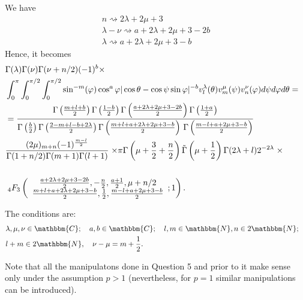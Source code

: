 \documentclass{article}
\begin{document}
\begin{answer}
  We have
  \begin{eqnarray}
    & n \rightsquigarrow 2 \lambda + 2 \mu + 3 &  \nonumber\\
    & \lambda - \nu \rightsquigarrow a + 2 \lambda + 2 \mu + 3 - 2 b & 
    \nonumber\\
    & \lambda \rightsquigarrow a + 2 \lambda + 2 \mu + 3 - b &  \nonumber
  \end{eqnarray}
  Hence, it becomes
  \begin{eqnarray}
    & \Gamma (\lambda) \Gamma (\nu) \Gamma (\nu + n / 2) (- 1)^b \times & 
    \nonumber\\
    & \int_0^{\pi} \int_0^{\pi / 2} \int_0^{\pi / 2} \sin^{- m} (\varphi)
    \cos^a \varphi | \cos \theta - \cos \psi \sin \varphi |^{- b}
    v^{\lambda}_l (\theta) v_m^{\mu} (\psi) v_n^{\nu} (\varphi) d \psi d
    \varphi d \theta = &  \nonumber\\
    & = \frac{\Gamma \left( \frac{m + l + b}{2} \right) \Gamma \left( \frac{1
    - b}{2} \right) \Gamma \left( \frac{a + 2 \lambda + 2 \mu + 3 - 2 b}{2}
    \right) \Gamma \left( \frac{1 + a}{2} \right)}{\Gamma \left( \frac{b}{2}
    \right) \Gamma \left( \frac{2 - m + l - b + 2 \lambda}{2} \right) \Gamma
    \left( \frac{m + l + a + 2 \lambda + 2 \mu + 3 - b}{2} \right) 
    \hspace{0.17em} \Gamma \left( \frac{m - l + a + 2 \mu + 3 - b}{2} \right)}
    &  \nonumber\\
    & \frac{(2 \mu)_{m + n} (- 1)^{\frac{m - l}{2}}}{\Gamma (1 + n / 2)
    \Gamma (m + 1) \Gamma (l + 1)} \left. \times \pi \Gamma \left( \mu +
    \frac{3}{2} + \frac{n}{2} \right) \tilde{\Gamma} \left( \mu + \frac{1}{2}
    \right) \Gamma (2 \lambda + l) 2^{- 2 \lambda} \right. \times & 
    \nonumber\\
    &  &  \nonumber\\
    & \;_4 F_3 \left( \begin{array}{c}
      \frac{a + 2 \lambda + 2 \mu + 3 - 2 b}{2}, - \frac{n}{2}, \frac{a +
      1}{2}, \mu + n / 2\\
      \frac{m + l + a + 2 \lambda + 2 \mu + 3 - b}{2}, \frac{1}{2}, \frac{m -
      l + a + 2 \mu + 3 - b}{2}
    \end{array} ; 1 \right) . &  \nonumber
  \end{eqnarray}
\end{answer}

The conditions are:
\begin{eqnarray}
  & \lambda, \mu, \nu \in \mathbbm{C}; \quad a, b \in \mathbbm{C}; \quad l, m
  \in \mathbbm{N}, n \in 2\mathbbm{N}; &  \nonumber\\
  & l + m \in 2\mathbbm{N}, \quad \nu - \mu = m + \frac{1}{2} . &  \nonumber
\end{eqnarray}
\begin{remark}
  Note that all the manipulatons done in Question 5 and prior to it make sense
  only under the assumption $p > 1$ (nevertheless, for $p = 1$ similar
  manipulations can be introduced).
\end{remark}
\end{document}
